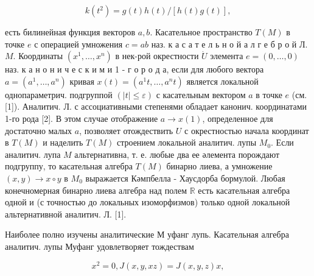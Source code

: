 \documentclass[10pt]{article}
\begin{document}
\[

k\left(t^{2}\right)=g(t) h(t) /[h(t) g(t)],

\]



есть билинейная функция векторов $a, b$. Касательное пространство $T(M)$ в точке $e$ с операцией умножения $c=a b$ наз. к а с а т е л ь н о й а л г е б р о й Л. $M$. Координаты $\left(x^{1}, \ldots, x^{n}\right)$ в нек-рой окрестности $\dot{U}$ элемента $e=(0, \ldots, 0)$ наз. к а н о н и ч е с к и м и 1 - г о р о д а, если для любого вектора $a=\left(a^{1}, \ldots, a^{n}\right)$ кривая $x(t)=\left(a^{1} t, \ldots, a^{n} t\right)$ является локальной однопараметрич. подгруппой $(|t| \leqslant \varepsilon)$ с касательным вектором $a$ в точке $e$ (см. [1]). Аналитич. Л. с ассоциативными степенями обладает канонич. координатами 1-го рода [2]. В этом случае отображение $a \rightarrow x(1)$, определенное для достаточно малых $a$, позволяет отождествить $U$ с окрестностью начала координат в $T(M)$ и наделить $T(M)$ строением локальной аналитич. лупы $M_{0}$. Если аналитич. лупа $M$ альтернативна, т. е. любые два ее әлемента порождают подгруппу, то касательная алгебра $T(M)$ бинарно лиева, а умножение $(x, y) \rightarrow x \circ y$ в $M_{0}$ выражается Кәмпбелла - Хаусдорба бормулой. Любая конечномерная бинарно лиева алгебра над полем $\mathbb{R}$ есть касательная алгебра одной и (с точностью до локальных изоморфизмов) только одной локальной альтернативной аналитич. Л. [1].



Наиболее полно изучены аналитические $М$ уфанг лупь. Касательная алгебра аналитич. лупы Муфанг удовлетворяет тождествам



\[

x^{2}=0, J(x, y, x z)=J(x, y, z) x,

\]
\end{document}
